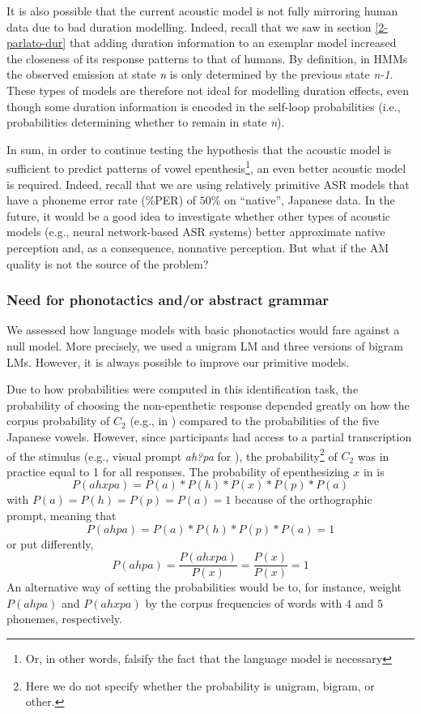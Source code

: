 {It is also possible that the current acoustic model is not fully mirroring human data due to bad duration modelling. Indeed, recall that we saw in section \ref{2-parlato-dur} that adding duration information to an exemplar model increased the closeness of its response patterns to that of humans. By definition, in HMMs the observed emission at state \textit{n} is only determined by the previous state \textit{n-1}. These types of models are therefore not ideal for modelling duration effects, even though some duration information is encoded in the self-loop probabilities (i.e., probabilities determining whether to remain in state \textit{n}).

In sum, in order to continue testing the hypothesis that the acoustic model is sufficient to predict patterns of vowel epenthesis\footnote{Or, in other words, falsify the fact that the language model is necessary}, an even better acoustic model is required. Indeed, recall that we are using relatively primitive ASR models that have a phoneme error rate (\%PER) of $50\%$ on ``native'', Japanese data. In the future, it would be a good idea to investigate whether other types of acoustic models (e.g., neural network-based ASR systems) better approximate native perception and, as a consequence, nonnative perception. But what if the AM quality is not the source of the problem?

\subsubsection{Need for phonotactics and/or abstract grammar}
We assessed how language models with basic phonotactics would fare against a null model. More precisely, we used a unigram LM and three versions of bigram LMs. However, it is always possible to improve our primitive models.

Due to how probabilities were computed in this identification task, the probability of choosing the non-epenthetic response depended greatly on how the corpus probability of $C_{2}$ (e.g.,  in ) compared to the probabilities of the five Japanese vowels. However, since participants had access to a partial transcription of the stimulus (e.g., visual prompt \textit{ah?pa} for ), the probability\footnote{Here we do not specify whether the probability is unigram, bigram, or other.} of $C_{2}$ was in practice equal to 1 for all responses. The probability of epenthesizing $x$ in  is
\begin{equation}
  P(ahxpa) = P(a) * P(h) * P(x) * P(p) * P(a)
\end{equation}
with $P(a) = P(h) = P(p) = P(a) = 1$ because of the orthographic prompt, meaning that
\begin{equation}
  P(ahpa) = P(a) * P(h) * P(p) * P(a) = 1
\end{equation}
or put differently,
\begin{equation}
  P(ahpa) = \frac{P(ahxpa)}{P(x)} = \frac{P(x)}{P(x)} = 1
\end{equation}
An alternative way of setting the probabilities would be to, for instance, weight $P(ahpa)$ and $P(ahxpa)$ by the corpus frequencies of words with $4$ and $5$ phonemes, respectively.   

}

